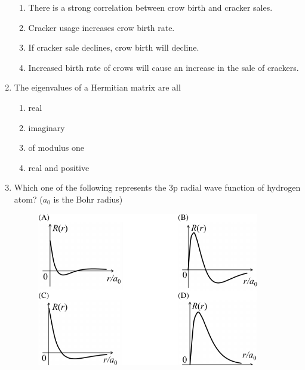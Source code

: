 \documentclass[journal,12pt,onecolumn]{IEEEtran}
\theoremstyle{remark}
\begin{document}
\begin{enumerate}
    \hfill{} \begin{enumerate}
        \item There is a strong correlation between crow birth and cracker sales.
        \item Cracker usage increases crow birth rate.
        \item If cracker sale declines, crow birth will decline.
        \item Increased birth rate of crows will cause an increase in the sale of crackers.
    \end{enumerate}

\newpage

    \item The eigenvalues of a Hermitian matrix are all
 \hfill{} \begin{enumerate}
        \item real
        \item imaginary
        \item of modulus one
        \item real and positive
    \end{enumerate}

    \item Which one of the following represents the 3p radial wave function of hydrogen atom? ($a_0$ is the Bohr radius)\hfill{}

    \begin{figure}[H]
        \centering
        \caption*{} \label{fig:12o} \includegraphics{figs/12.png}
    \end{figure}


\end{enumerate}
\end{document}
